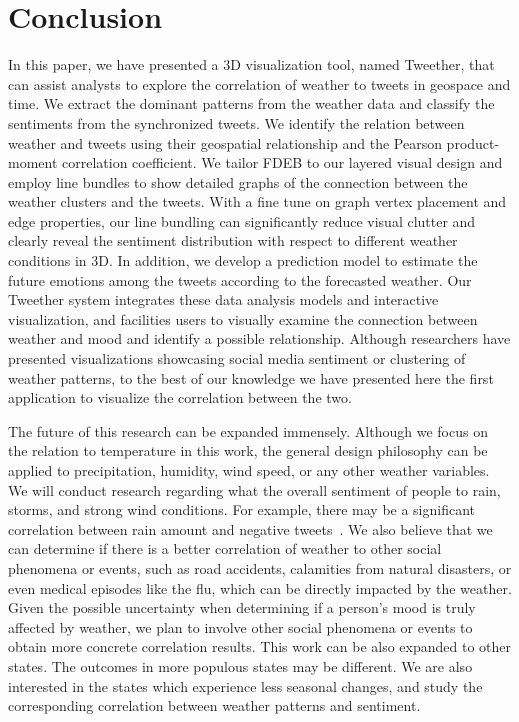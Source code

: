 \chapter{Conclusion}

In this paper, we have presented a 3D visualization tool, named Tweether, that can assist analysts to explore the correlation of weather to tweets in geospace and time. We extract the dominant patterns from the weather data and classify the sentiments from the synchronized tweets. We identify the relation between weather and tweets using their geospatial relationship and the Pearson product-moment correlation coefficient. We tailor FDEB to our layered visual design and employ line bundles to show detailed graphs of the connection between the weather clusters and the tweets. With a fine tune on graph vertex placement and edge properties, our line bundling can significantly reduce visual clutter and clearly reveal the sentiment distribution with respect to different weather conditions in 3D. In addition, we develop a prediction model to estimate the future emotions among the tweets according to the forecasted weather. Our Tweether system integrates these data analysis models and interactive visualization, and facilities users to visually examine the connection between weather and mood and identify a possible relationship.
%
Although researchers have presented visualizations showcasing social media sentiment or clustering of weather patterns, to the best of our knowledge we have presented here the first application to visualize the correlation between the two.


The future of this research can be expanded immensely. Although we focus on the relation to temperature in this work, the general design philosophy can be applied to precipitation, humidity, wind speed, or any other weather variables.
We will conduct research regarding what the overall sentiment of people to rain, storms, and strong wind conditions. For example, there may be a significant correlation between rain amount and negative tweets~\cite{hannak2012tweetin}. We also believe that we can determine if there is a better correlation of weather to other social phenomena or events, such as road accidents, calamities from natural disasters, or even medical episodes like the flu, which can be directly impacted by the weather. Given the possible uncertainty when determining if a person's mood is truly affected by weather, we plan to involve other social phenomena or events to obtain more concrete correlation results.
%
This work can be also expanded to other states. The outcomes in more populous states may be different. We are also interested in the states which experience less seasonal changes, and study the corresponding correlation between weather patterns and sentiment.

